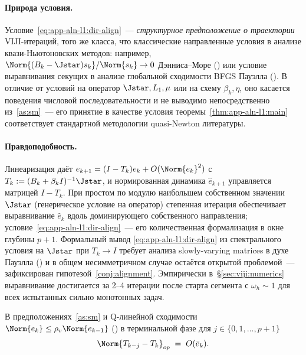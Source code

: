 \paragraph{Природа условия.}
Условие~\eqref{eq:app-aln-l1:dir-align}~--- \emph{структурное
предположение о траектории} VIJI-итераций, того же класса, что
классические направленные условия в анализе квази-Ньютоновских
методов: например, $\Norm{(B_k-\Jstar)s_k}/\Norm{s_k}\to 0$
Дэнниса--Море \textup{(}\cite[Theorem~8.2.4]{dennis1996}\textup{)}
или условие выравнивания секущих в анализе глобальной сходимости
BFGS Пауэлла \textup{(}\cite{powell1971}\textup{)}. В отличие от
условий на оператор $\Jstar, L_1, \mu$ или на схему $\beta_k, \eta$,
оно касается поведения числовой последовательности и не выводимо
непосредственно из~\ref{as:sm}~--- его принятие в качестве условия
теоремы~\ref{thm:app-aln-l1:main} соответствует стандартной
методологии quasi-Newton литературы.

\paragraph{Правдоподобность.}
Линеаризация даёт $e_{k+1} = (I - T_k)e_k + O(\Norm{e_k}^{2})$ с
$T_k := (B_k+\beta_k I)^{-1}\Jstar$, и нормированная динамика
$\hat e_{k+1}$ управляется матрицей $I - T_k$. При простом по модулю
наибольшем собственном значении $\Jstar$ \textup{(}генерическое условие
на оператор\textup{)} степенная итерация обеспечивает выравнивание
$\hat e_k$ вдоль доминирующего собственного направления;
условие~\eqref{eq:app-aln-l1:dir-align}~--- его количественная
формализация в окне глубины $p+1$. Формальный вывод
\eqref{eq:app-aln-l1:dir-align} из спектрального условия на $\Jstar$
при $T_k\to I$ требует анализа slowly-varying matrices в духе Пауэлла
\textup{(}\cite{powell1971}\textup{)} и в общем несимметричном случае
остаётся открытой проблемой~--- зафиксирован
гипотезой~\ref{conj:alignment}. Эмпирически в~\S\ref{sec:viji:numerics}
выравнивание достигается за 2--4 итерации после старта сегмента с
$\omega_h \sim 1$ для всех испытанных сильно монотонных задач.

\begin{lemma}
\label{lem:app-aln-l1:slow-T}
В предположениях~\ref{as:sm} и Q-линейной сходимости
$\Norm{e_k}\le\rho_v\Norm{e_{k-1}}$ \textup{(}\cite[Theorem~3.4]{Agafonov2024VIJI}\textup{)}
в терминальной фазе для $j \in \{0,1,\ldots,p+1\}$
\begin{equation}
\Norm{T_{k-j} - T_k}_{op} \;=\; O(\bar e_k).
\label{eq:app-aln-l1:slow-T}
\end{equation}
\end{lemma}

